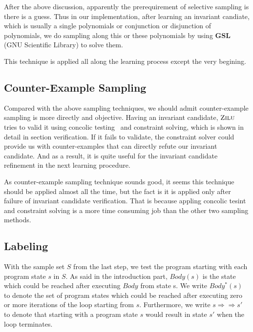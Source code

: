 After the above discussion, apparently the prerequirement of selective sampling is there is a guess.
Thus in our implementation, after learning an invariant candiate, 
which is usually a single polynomials or conjunction or disjunction of polynomials,
we do sampling along this or these polynomials by using \textbf{GSL} (GNU Scientific Library) to solve them.

This technique is applied all along the learning process except the very begining.



\subsection{Counter-Example Sampling}
Compared with the above sampling techniques, we should admit counter-example sampling is more directly and objective.  
Having an invariant candidate, $\textsc{Zilu}$ tries to valid it using concolic testing~\cite{} and constraint solving,
which is shown in detail in section verification.
If it fails to validate, the constraint solver could provide us with counter-examples that can directly refute our invariant candidate.
And as a result, it is quite useful for the invariant candidate refinement in the next learning procedure.

As counter-example sampling technique sounds good, it seems this technique should be applied almost all the time, 
but the fact is it is applied only after failure of invariant candidate verification.
That is because appling concolic tesint and constraint solving is a more time consuming job than the other two sampling methods.

\subsection {Labeling}
With the sample set $S$ from the last step, we test the program starting with each program state $s$ in $S$. 
As said in the introduction part, $Body(s)$ is the state which could be reached after executing $Body$ from state s.
We write $Body^*(s)$ to denote the set of program states which could be reached after executing zero or more iterations of the loop starting from $s$.
Furthermore, we write $s \Rightarrow\Rightarrow s'$ to denote that starting with a program state $s$ would result in state $s'$ when the loop terminates. 

